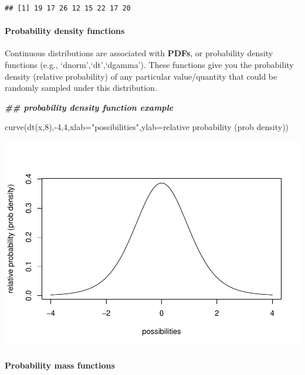 \documentclass[
]{article}
\newenvironment{Shaded}{\begin{snugshade}}{\end{snugshade}}
\newcommand{\AttributeTok}[1]{\textcolor[rgb]{0.77,0.63,0.00}{#1}}
\newcommand{\DecValTok}[1]{\textcolor[rgb]{0.00,0.00,0.81}{#1}}
\newcommand{\DocumentationTok}[1]{\textcolor[rgb]{0.56,0.35,0.01}{\textbf{\textit{#1}}}}
\newcommand{\FunctionTok}[1]{\textcolor[rgb]{0.00,0.00,0.00}{#1}}
\newcommand{\NormalTok}[1]{#1}
\newcommand{\SpecialCharTok}[1]{\textcolor[rgb]{0.00,0.00,0.00}{#1}}
\newcommand{\StringTok}[1]{\textcolor[rgb]{0.31,0.60,0.02}{#1}}
\begin{document}
\begin{verbatim}
## [1] 19 17 26 12 15 22 17 20
\end{verbatim}

\hypertarget{probability-density-functions}{%
\paragraph{Probability density
functions}\label{probability-density-functions}}

Continuous distributions are associated with \textbf{PDFs}, or
probability density functions (e.g., `dnorm',`dt',`dgamma'). These
functions give you the probability density (relative probability) of any
particular value/quantity that could be randomly sampled under this
distribution.

\begin{Shaded}
\begin{Highlighting}[]
\DocumentationTok{\#\# probability density function example }

\FunctionTok{curve}\NormalTok{(}\FunctionTok{dt}\NormalTok{(x,}\DecValTok{8}\NormalTok{),}\SpecialCharTok{{-}}\DecValTok{4}\NormalTok{,}\DecValTok{4}\NormalTok{,}\AttributeTok{xlab=}\StringTok{"possibilities"}\NormalTok{,}\AttributeTok{ylab=}\StringTok{\textquotesingle{}relative probability (prob density)\textquotesingle{}}\NormalTok{)}
\end{Highlighting}
\end{Shaded}

\includegraphics{LECTURE2_files/figure-latex/unnamed-chunk-16-1.pdf}

\hypertarget{probability-mass-functions}{%
\paragraph{Probability mass
functions}\label{probability-mass-functions}}
\end{document}
